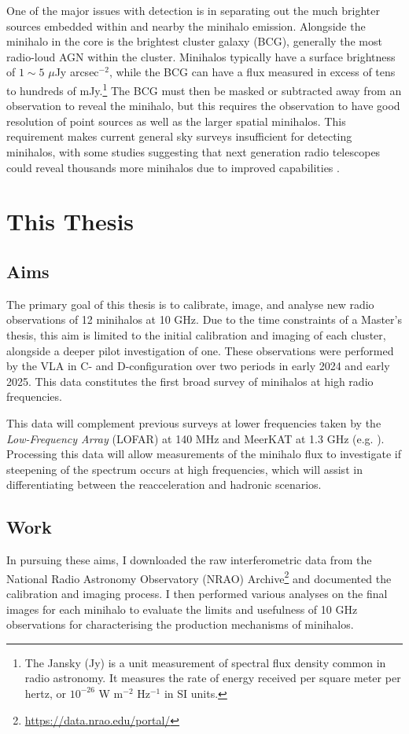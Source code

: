 One of the major issues with detection is in separating out the much brighter sources embedded within and nearby the minihalo emission. Alongside the minihalo in the core is the brightest cluster galaxy (BCG), generally the most radio-loud AGN within the cluster. Minihalos typically have a surface brightness of $1\sim5$ $\mu$Jy arcsec$^{-2}$, while the BCG can have a flux measured in excess of tens to hundreds of mJy.\footnote{The Jansky (Jy) is a unit measurement of spectral flux density common in radio astronomy. It measures the rate of energy received per square meter per hertz, or $10^{-26}$ W m$^{-2}$ Hz$^{-1}$ in SI units.} The BCG must then be masked or subtracted away from an observation to reveal the minihalo, but this requires the observation to have good resolution of point sources as well as the larger spatial minihalos. This requirement makes current general sky surveys insufficient for detecting minihalos, with some studies suggesting that next generation radio telescopes could reveal thousands more minihalos due to improved capabilities \citep{Gitti2018}.

\section{This Thesis}
\subsection{Aims}
The primary goal of this thesis is to calibrate, image, and analyse new radio observations of 12 minihalos at 10 GHz. Due to the time constraints of a Master's thesis, this aim is limited to the initial calibration and imaging of each cluster, alongside a deeper pilot investigation of one. These observations were performed by the VLA in C- and D-configuration over two periods in early 2024 and early 2025. This data constitutes the first broad survey of minihalos at high radio frequencies. 

This data will complement previous surveys at lower frequencies taken by the \textit{Low-Frequency Array} (LOFAR) at 140 MHz and MeerKAT at 1.3 GHz (e.g. \citealp{Riseley2022}). Processing this data will allow measurements of the minihalo flux to investigate if steepening of the spectrum occurs at high frequencies, which will assist in differentiating between the reacceleration and hadronic scenarios. 

\subsection{Work}
In pursuing these aims, I downloaded the raw interferometric data from the National Radio Astronomy Observatory (NRAO) Archive\footnote{\url{https://data.nrao.edu/portal/}} and documented the calibration and imaging process. I then performed various analyses on the final images for each minihalo to evaluate the limits and usefulness of 10 GHz observations for characterising the production mechanisms of minihalos.

